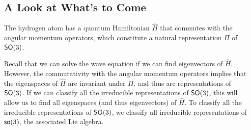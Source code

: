 \subsection{A Look at What's to Come}
The hydrogen atom has a quantum Hamiltonian $\hat{H}$ that commutes with the angular momentum operators, which constitute a natural representation $\Pi$ of $\operatorname{\textsf{SO}}(3)$.

Recall that we can solve the wave equation if we can find eigenvectors of $\hat{H}$. However, the commutativity with the angular momentum operators implies that the eigenspaces of $\hat{H}$ are invariant under $\Pi$, and thus are representations of $\operatorname{\textsf{SO}}(3)$. If we can classify all the irreducible representations of $\operatorname{\textsf{SO}}(3)$, this will allow us to find all eigenspaces (and thus eigenvectors) of $\hat{H}$. To classify all the irreducible representations of $\operatorname{\textsf{SO}}(3)$, we classify all irreducible representations of $\operatorname{\textsf{so}}(3)$, the associated Lie algebra.
